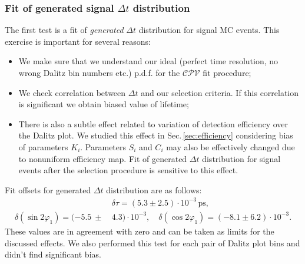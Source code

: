 \documentclass[preprint,aps,showpacs]{revtex4}
\newcommand{\dt}{\ensuremath{\Delta t}\xspace}
\newcommand{\cpvconj}{\ensuremath{\mathcal{CPV}}\xspace}
\newcommand{\sindbeta}{\ensuremath{\sin{2\varphi_1}}\xspace}
\newcommand{\cosdbeta}{\ensuremath{\cos{2\varphi_1}}\xspace}
\begin{document}
\subsubsection{Fit of generated signal \dt distribution}\label{sec:mc_cpv_gen_fit}
The first test is a fit of {\it generated} \dt distribution for signal MC events. This exercise is important for several reasons:
\begin{itemize}
 \item We make sure that we understand our ideal (perfect time resolution, no wrong Dalitz bin numbers etc.) p.d.f. for the \cpvconj fit procedure;
 \item We check correlation between \dt and our selection criteria. If this correlation is significant we obtain biased value of lifetime;
 \item There is also a subtle effect related to variation of detection efficiency over the Dalitz plot. We studied this effect in Sec.\,\ref{sec:efficiency} considering bias of parameters $K_i$. Parameters $S_i$ and $C_i$ may also be effectively changed  due to nonuniform efficiency map. Fit of generated \dt distribution for signal events after the selection procedure is sensitive to this effect.
\end{itemize}
Fit offsets for generated \dt distribution are as follows:
\begin{equation}\label{eq:gen_offsets}
\begin{split}
 &\delta\tau = (5.3 \pm 2.5)\cdot10^{-3}\,\text{ps},\\
 \delta(\sindbeta) = (-5.5\ \pm\ &4.3)\cdot 10^{-3},\quad\delta(\cosdbeta) = (-8.1 \pm 6.2)\cdot 10^{-3}.
\end{split}
\end{equation}
These values are in agreement with zero and can be taken as limits for the discussed effects. We also performed this test for each pair of Dalitz plot bins and didn't find significant bias.
\end{document}
